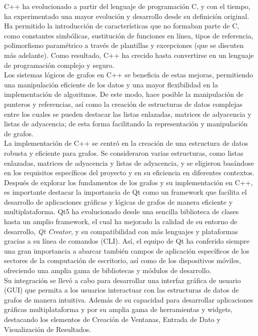 \documentclass[conference]{IEEEtran}
\begin{document}
C++ ha evolucionado a partir del lenguaje de programación C, y con el tiempo, ha experimentado una mayor evolución y desarrollo desde su definición original. Ha permitido la introducción de características que no formaban parte de C, como constantes simbólicas, sustitución de funciones en línea, tipos de referencia, polimorfismo paramétrico a través de plantillas y excepciones (que se discuten más adelante). Como resultado, C++ ha crecido hasta convertirse en un lenguaje de programación complejo y seguro.\cite{C++} \\
Los sistemas lógicos de grafos en C++ se beneficia de estas mejoras, permitiendo una manipulación eficiente de los datos y una mayor flexibilidad en la implementación de algoritmos. De este modo, hace posible la manipulación de punteros y referencias, así como la creación de estructuras de datos complejas entre los cuales se pueden destacar las listas enlazadas, matrices de adyacencia y listas de adyacencia; de esta forma facilitando la representación y manipulación de grafos.\\
La implementación de C++ se centró en la creación de una estructura de datos robusta y eficiente para grafos. Se consideraron varias estructuras, como listas enlazadas, matrices de adyacencia y listas de adyacencia, y se eligieron basándose en los requisitos específicos del proyecto y en su eficiencia en diferentes contextos.\\

Después de explorar los fundamentos de los grafos y su implementación en C++, es importante destacar la importancia de Qt como un framework que facilita el desarrollo de aplicaciones gráficas y lógicas de grafos de manera eficiente y multiplataforma. Qt5 ha evolucionado desde una sencilla biblioteca de clases hasta un amplio framework, el cual ha mejorado la calidad de su entorno de desarrollo, \textit{Qt Creator}, y su compatibilidad con más lenguajes y plataformas gracias a su línea de comandos (CLI). Así, el equipo de Qt ha conferido siempre una gran importancia a abarcar también campos de aplicación específicos de los sectores de la computación de escritorio, así como de los dispositivos móviles, ofreciendo una amplia gama de bibliotecas y módulos de desarrollo.\cite{Qt}\\
Su integración se llevó a cabo para desarrollar una interfaz gráfica de usuario (GUI) que permita a los usuarios interactuar con las estructuras de datos de grafos de manera intuitiva. Además de su capacidad para desarrollar aplicaciones gráficas multiplataforma y por su amplia gama de herramientas y widgets, destacando los elementos de Creación de Ventanas, Entrada de Dato y Visualización de Resultados.
\end{document}

